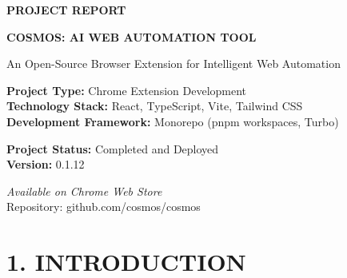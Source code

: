\documentclass[12pt,a4paper]{article}
\title{}
\author{}
\date{}
\begin{document}
\begin{titlepage}
    \centering
    \vspace*{2cm}
    
    {\fontsize{18}{22}\selectfont\textbf{PROJECT REPORT}}
    
    \vspace{1.5cm}
    
    {\fontsize{16}{20}\selectfont\textbf{COSMOS: AI WEB AUTOMATION TOOL}}
    
    \vspace{1.5cm}
    
    {\fontsize{14}{18}\selectfont An Open-Source Browser Extension for Intelligent Web Automation}
    
    \vspace{3cm}
    
    {\fontsize{12}{14}\selectfont
    \textbf{Project Type:} Chrome Extension Development \\
    \vspace{0.5cm}
    \textbf{Technology Stack:} React, TypeScript, Vite, Tailwind CSS \\
    \vspace{0.5cm}
    \textbf{Development Framework:} Monorepo (pnpm workspaces, Turbo) \\
    }
    
    \vspace{3cm}
    
    {\fontsize{12}{14}\selectfont
    \textbf{Project Status:} Completed and Deployed \\
    \vspace{0.5cm}
    \textbf{Version:} 0.1.12 \\
    }
    
    \vfill
    
    {\fontsize{12}{14}\selectfont
    \textit{Available on Chrome Web Store} \\
    \vspace{0.3cm}
    Repository: github.com/cosmos/cosmos \\
    }
    
\end{titlepage}

\newpage
\tableofcontents
\newpage

\section*{\textbf{1. INTRODUCTION}}
\end{document}
